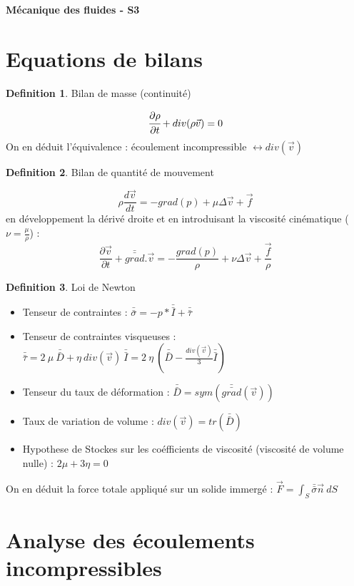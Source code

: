 \documentclass[french]{article}
\theoremstyle{definition}
\newtheorem{definition}{Definition}[section]
\begin{document}
\begin{center}
	\textbf{\Large{Mécanique des fluides - S3}}
\end{center}

\section{Equations de bilans}
\begin{definition}Bilan de masse (continuité)\par
$$ \cfrac{\partial \rho}{\partial t} + div(\rho \vec{v}) = 0 $$
	On en déduit l'équivalence : écoulement incompressible $ \leftrightarrow div(\vec{v})$
\end{definition}

\begin{definition}Bilan de quantité de mouvement\par
	$$ \rho \frac{d \vec{v}}{dt} = -grad(p) + \mu \Delta\vec{v} + \vec{f} $$
	en développement la dérivé droite et en introduisant la viscosité cinématique ($\nu = \frac{\mu}{\rho}$) :
	$$ \frac{\partial \vec{v}}{\partial t} + \bar{\bar{grad}}.\vec{v} = -\frac{grad(p)}{\rho} + \nu \Delta\vec{v} + \frac{\vec{f}}{\rho} $$
\end{definition}

\begin{definition}Loi de Newton\par
	\begin{itemize} 
		\item Tenseur de contraintes : $\bar{\bar{\sigma}} = -p* \bar{\bar{I}} + \bar{\bar{\tau}}$
		\item Tenseur de contraintes visqueuses : $ \bar{\bar{\tau}} = 2 \ \mu \ \bar{\bar{D}} + \eta \ div(\vec{v}) \ \bar{\bar{I}} = 2 \ \eta \ (\bar{\bar{D}} - \frac{div(\vec{v})}{3} \bar{\bar{I}}) $
		\item Tenseur du taux de déformation : $ \bar{\bar{D}} = sym(\bar{\bar{grad}}(\vec{v})) $
		\item Taux de variation de volume : $div(\vec{v}) = tr(\bar{\bar{D}})$
		\item Hypothese de Stockes sur les coéfficients de viscosité (viscosité de volume nulle) : $ 2 \mu + 3 \eta =0$
	\end{itemize}
	On en déduit la force totale appliqué sur un solide immergé : $ \vec{F} = \int_S \bar{\bar{\sigma}} \vec{n} \ dS $
\end{definition}

\section{Analyse des écoulements incompressibles}
\end{document}
